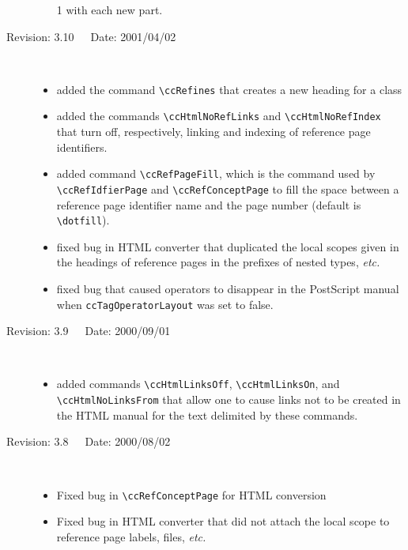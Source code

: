 \documentclass[11pt]{article}
\begin{document}
\begin{description}
\begin{itemize}
             1 with each new part.
    \end{itemize}
    \item[Revision: 3.10~~~Date: 2001/04/02]~\\[-3mm]
    \begin{itemize}
       \item added the command \verb|\ccRefines| that creates a new
             heading for a class
       \item added the commands \verb|\ccHtmlNoRefLinks|
             and \verb|\ccHtmlNoRefIndex| that turn off, respectively,
             linking and indexing of reference page identifiers.
       \item added command \verb|\ccRefPageFill|, which is the command used
             by \verb|\ccRefIdfierPage| and \verb|\ccRefConceptPage| to fill
             the space between a reference page identifier name and
             the page number (default is \verb|\dotfill|).
       \item fixed bug in HTML converter that duplicated the local scopes
             given in the headings of reference pages in the prefixes of
             nested types, {\em etc.}
       \item fixed bug that caused operators to disappear in the
             PostScript manual when \verb|ccTagOperatorLayout| was set to false.
    \end{itemize}
    \item[Revision: 3.9~~~Date: 2000/09/01]~\\[-3mm]
    \begin{itemize}
       \item added commands \verb|\ccHtmlLinksOff|, \verb|\ccHtmlLinksOn|,
             and \verb|\ccHtmlNoLinksFrom| that allow one to cause links not
             to be created in the HTML manual for the text delimited by
             these commands.
    \end{itemize}
    \item[Revision: 3.8~~~Date: 2000/08/02]~\\[-3mm]
    \begin{itemize}
        \item Fixed bug in \verb|\ccRefConceptPage| for HTML conversion
        \item Fixed bug in HTML converter that did not attach the local scope
              to reference page labels, files, {\em etc.}

\end{itemize}
\end{description}
\end{document}
